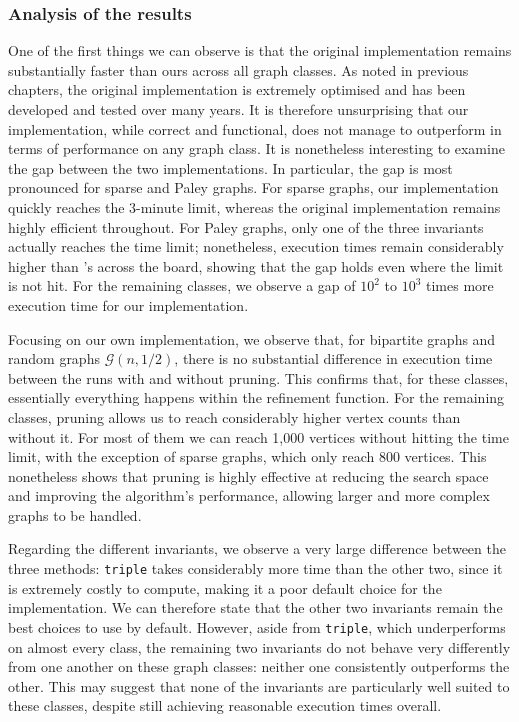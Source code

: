 \newpage

\subsubsection{Analysis of the results}

One of the first things we can observe is that the original \Naut{} implementation remains substantially faster than ours across all graph classes. As noted in previous chapters, the original \Naut{} implementation is extremely optimised and has been developed and tested over many years. It is therefore unsurprising that our implementation, while correct and functional, does not manage to outperform \Naut{} in terms of performance on any graph class. It is nonetheless interesting to examine the gap between the two implementations. In particular, the gap is most pronounced for sparse and Paley graphs. For sparse graphs, our implementation quickly reaches the 3-minute limit, whereas the original \Naut{} implementation remains highly efficient throughout. For Paley graphs, only one of the three invariants actually reaches the time limit; nonetheless, execution times remain considerably higher than \Naut{}'s across the board, showing that the gap holds even where the limit is not hit. For the remaining classes, we observe a gap of $10^{2}$ to $10^{3}$ times more execution time for our implementation.

Focusing on our own implementation, we observe that, for bipartite graphs and random graphs $\mathcal{G}(n, 1/2)$, there is no substantial difference in execution time between the runs with and without pruning. This confirms that, for these classes, essentially everything happens within the refinement function. For the remaining classes, pruning allows us to reach considerably higher vertex counts than without it. For most of them we can reach 1,000 vertices without hitting the time limit, with the exception of sparse graphs, which only reach 800 vertices. This nonetheless shows that pruning is highly effective at reducing the search space and improving the algorithm's performance, allowing larger and more complex graphs to be handled.

Regarding the different invariants, we observe a very large difference between the three methods: \texttt{triple} takes considerably more time than the other two, since it is extremely costly to compute, making it a poor default choice for the implementation. We can therefore state that the other two invariants remain the best choices to use by default. However, aside from \texttt{triple}, which underperforms on almost every class, the remaining two invariants do not behave very differently from one another on these graph classes: neither one consistently outperforms the other. This may suggest that none of the invariants are particularly well suited to these classes, despite still achieving reasonable execution times overall.


